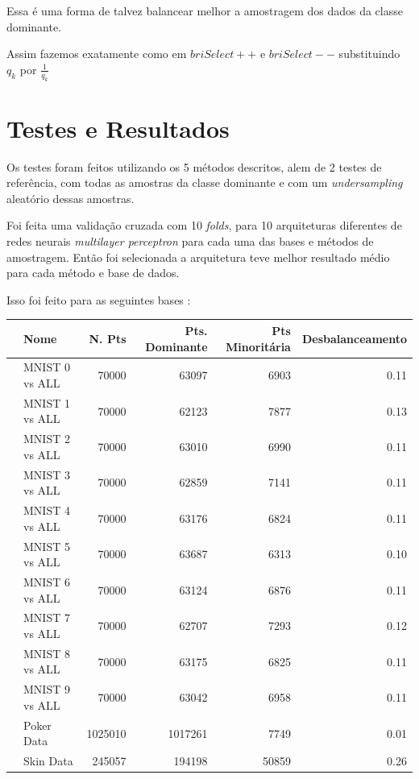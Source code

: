 \documentclass[]{article}
\begin{document}
		Essa é uma forma de talvez balancear melhor a amostragem dos dados da classe dominante.
		
		Assim fazemos exatamente como em $briSelect++$ e $briSelect--$ substituindo $q_k$ por $\frac{1}{q_k}$
		
	\section{Testes e Resultados}
	Os testes foram feitos utilizando os 5 métodos descritos, alem de 2 testes de referência, com todas as amostras da classe dominante e com um \textit{undersampling} aleatório dessas amostras.
	
	Foi feita uma validação cruzada com 10 \textit{folds}, para 10 arquiteturas diferentes de redes neurais \textit{multilayer perceptron} para cada uma das bases e métodos de amostragem. Então foi selecionada a arquitetura teve melhor resultado médio para cada método e base de dados.
	
	Isso foi feito para as seguintes bases :
	
	\begin{table}[H]
		\centering
		\begin{tabular}{rlrrrr}
			\hline
			& Nome & N. Pts & Pts. Dominante & Pts Minoritária & Desbalanceamento \\ 
			\hline
			& MNIST 0 vs ALL & 70000 & 63097 & 6903 & 0.11 \\ 
			& MNIST 1 vs ALL & 70000 & 62123 & 7877 & 0.13 \\ 
			& MNIST 2 vs ALL & 70000 & 63010 & 6990 & 0.11 \\ 
			& MNIST 3 vs ALL & 70000 & 62859 & 7141 & 0.11 \\ 
			& MNIST 4 vs ALL & 70000 & 63176 & 6824 & 0.11 \\ 
			& MNIST 5 vs ALL & 70000 & 63687 & 6313 & 0.10 \\ 
			& MNIST 6 vs ALL & 70000 & 63124 & 6876 & 0.11 \\ 
			& MNIST 7 vs ALL & 70000 & 62707 & 7293 & 0.12 \\ 
			& MNIST 8 vs ALL & 70000 & 63175 & 6825 & 0.11 \\ 
			& MNIST 9 vs ALL & 70000 & 63042 & 6958 & 0.11 \\ 
			& Poker Data & 1025010 & 1017261 & 7749 & 0.01 \\ 
			& Skin Data & 245057 & 194198 & 50859 & 0.26 \\ 
			\hline
		\end{tabular}
	\end{table}
	
\end{document}
